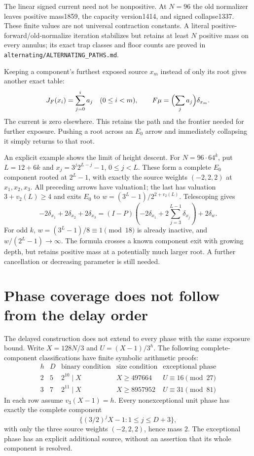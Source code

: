 \documentclass[11pt]{article}
\begin{document}
The linear signed current need not be nonpositive. At $N=96$ the old
normalizer leaves positive mass1859, the capacity version1414, and
signed collapse1337. These finite values are not universal contraction
constants. A literal positive-forward/old-normalize iteration stabilizes
but retains at least $N$ positive mass on every annulus; its exact trap
classes and floor counts are proved in
\texttt{alternating/ALTERNATING\_PATHS.md}.

Keeping a component's furthest exposed source $x_m$ instead of only its
root gives another exact table:
\[
 J_F(x_i)=\sum_{j=0}^{i}a_j\quad(0\le i<m),\qquad
 F\mu=\Bigl(\sum_j a_j\Bigr)\delta_{x_m}.
\]
The current is zero elsewhere. This retains the path and the frontier
needed for further exposure.
Pushing a root across an $E_0$ arrow and immediately collapsing it
simply returns to that root.

An explicit example shows the limit of height descent. For
$N=96\cdot64^k$, put $L=12+6k$ and
$x_j=3^j2^{L-j}-1$, $0\le j<L$.
These form a complete $E_0$ component rooted at $2^L-1$, with exactly
the source weights $(-2,2,2)$ at $x_1,x_2,x_3$.
All preceding arrows have valuation1; the last has valuation
$3+v_2(L)\ge4$ and exits $E_0$ to
$w=(3^L-1)/2^{2+v_2(L)}$. Telescoping gives
\[
 -2\delta_{x_1}+2\delta_{x_2}+2\delta_{x_3}
 =(I-P)\left(-2\delta_{x_1}
       +2\sum_{j=3}^{L-1}\delta_{x_j}\right)+2\delta_w.
\]
For odd $k$, $w=(3^L-1)/8\equiv1\pmod{18}$ is already inactive,
and $w/(2^L-1)\to\infty$. The formula crosses a known component
exit with growing depth, but retains positive mass at a potentially
much larger root. A further cancellation or decreasing parameter
is still needed.

\section{Phase coverage does not follow from the delay order}
The delayed construction does not extend to every phase with the same
exposure bound. Write $X=128N/3$ and $U=(X-1)/3^h$.
The following complete-component classifications have finite symbolic
arithmetic proofs:
\[
\begin{array}{c|c|c|c|c}
h&D&\text{binary condition}&\text{size condition}&
 \text{exceptional phase}\\ \hline
2&5&2^{10}\mid X&X\ge497664&U\equiv16\pmod{27}\\
3&7&2^{11}\mid X&X\ge8957952&U\equiv31\pmod{81}
\end{array}
\]
In each row assume $v_3(X-1)=h$. Every nonexceptional unit phase has
exactly the complete component
\[
\{(3/2)^jX-1:1\le j\le D+3\},
\]
with only the three source weights $(-2,2,2)$, hence mass $2$.
The exceptional phase has an explicit additional source, without an
assertion that its whole component is resolved.
\end{document}
